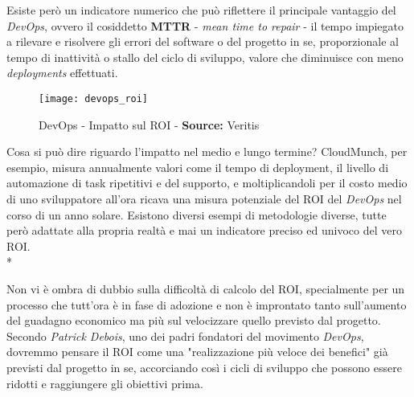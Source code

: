 \documentclass[../main.tex]{subfiles}
\begin{document}
        	    Esiste però un indicatore numerico che può riflettere il principale vantaggio del \emph{DevOps}, ovvero il cosiddetto \textbf{MTTR} - \emph{mean time to repair} - il tempo impiegato a rilevare e risolvere gli errori del software o del progetto in se, proporzionale al tempo di inattività o stallo del ciclo di sviluppo, valore che diminuisce con meno \emph{deployments} effettuati.
        	    
        	    \begin{figure}[ht]
        			\centering
        			\texttt{[image: devops\_roi]}
        			\caption{DevOps - Impatto sul ROI - \textbf{Source:} Veritis}
        			\label{fig:devops_roi}
        	    \end{figure}
        	    
        	    Cosa si può dire riguardo l'impatto nel medio e lungo termine? CloudMunch, per esempio, misura annualmente valori come il tempo di deployment, il livello di automazione di task ripetitivi e del supporto, e moltiplicandoli per il costo medio di uno sviluppatore all'ora ricava una misura potenziale del ROI del \emph{DevOps} nel corso di un anno solare. Esistono diversi esempi di metodologie diverse, tutte però adattate alla propria realtà e mai un indicatore preciso ed univoco del vero ROI.\\*
        	    
        	    Non vi è ombra di dubbio sulla difficoltà di calcolo del ROI, specialmente per un processo che tutt'ora è in fase di adozione e non è improntato tanto sull'aumento del guadagno economico ma più sul velocizzare quello previsto dal progetto. Secondo \emph{Patrick Debois}, uno dei padri fondatori del movimento \emph{DevOps}, dovremmo pensare il ROI come una "realizzazione più veloce dei benefici" già previsti dal progetto in se, accorciando così i cicli di sviluppo che possono essere ridotti e raggiungere gli obiettivi prima.
\end{document}
